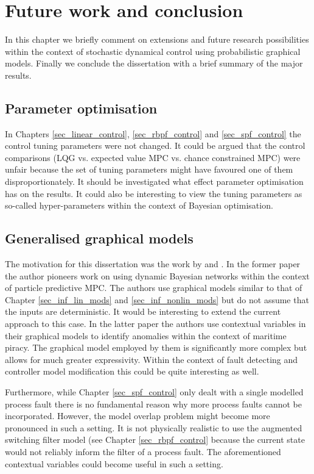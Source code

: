 \chapter{Future work and conclusion}
In this chapter we briefly comment on extensions and future research possibilities within the context of stochastic dynamical control using probabilistic graphical models. Finally we conclude the dissertation with a brief summary of the major results.

\section{Parameter optimisation}
In Chapters \ref{sec_linear_control}, \ref{sec_rbpf_control} and \ref{sec_spf_control} the control tuning parameters were not changed. It could be argued that the control comparisons (LQG vs. expected value MPC vs. chance constrained MPC) were unfair because the set of tuning parameters might have favoured one of them disproportionately. It should be investigated what effect parameter optimisation has on the results. It could also be interesting to view the tuning parameters as so-called hyper-parameters within the context of Bayesian optimisation. 

\section{Generalised graphical models}
The motivation for this dissertation was the work by \cite{devilliers} and \cite{dabrowski}. In the former paper the author pioneers work on using dynamic Bayesian networks within the context of particle predictive MPC. The authors use graphical models similar to that of Chapter \ref{sec_inf_lin_mods} and \ref{sec_inf_nonlin_mods} but do not assume that the inputs are deterministic. It would be interesting to extend the current approach to this case. In the latter paper the authors use contextual variables in their graphical models to identify anomalies within the context of maritime piracy. The graphical model employed by them is significantly more complex but allows for much greater expressivity. Within the context of fault detecting and controller model modification this could be quite interesting as well.

Furthermore, while Chapter \ref{sec_spf_control} only dealt with a single modelled process fault there is no fundamental reason why more process faults cannot be incorporated. However, the model overlap problem might become more pronounced in such a setting. It is not physically realistic to use the augmented switching filter model (see Chapter \ref{sec_rbpf_control} because the current state would not reliably inform the filter of a process fault. The aforementioned contextual variables could become useful in such a setting.


